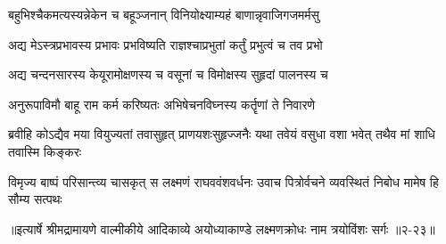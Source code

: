 \twolineshloka
{बहुभिश्चैकमत्यस्यन्नेकेन च बहूञ्जनान्}
{विनियोक्ष्याम्यहं बाणान्नृवाजिगजमर्मसु} %

\twolineshloka
{अद्य मेऽस्त्रप्रभावस्य प्रभावः प्रभविष्यति}
{राज्ञश्चाप्रभुतां कर्तुं प्रभुत्वं च तव प्रभो} %

\twolineshloka
{अद्य चन्दनसारस्य केयूरामोक्षणस्य च}
{वसूनां च विमोक्षस्य सुहृदां पालनस्य च} %

\twolineshloka
{अनुरूपाविमौ बाहू राम कर्म करिष्यतः}
{अभिषेचनविघ्नस्य कर्तॄणां ते निवारणे} %

\twolineshloka
{ब्रवीहि कोऽद्यैव मया वियुज्यतां तवासुहृत् प्राणयशःसुहृज्जनैः}
{यथा तवेयं वसुधा वशा भवेत् तथैव मां शाधि तवास्मि किङ्करः} %

\twolineshloka
{विमृज्य बाष्पं परिसान्त्व्य चासकृत् स लक्ष्मणं राघववंशवर्धनः}
{उवाच पित्रोर्वचने व्यवस्थितं निबोध मामेष हि सौम्य सत्पथः} %


॥इत्यार्षे श्रीमद्रामायणे वाल्मीकीये आदिकाव्ये अयोध्याकाण्डे लक्ष्मणक्रोधः नाम त्रयोविंशः सर्गः ॥२-२३॥
